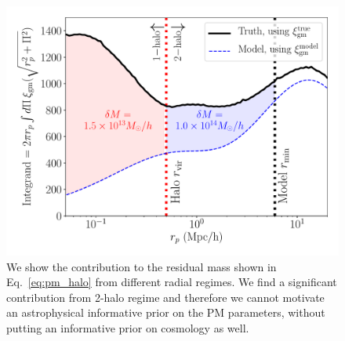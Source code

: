 \documentclass[aps, prd,twocolumn,superscriptaddress,nofootinbib,preprintnumbers]{revtex4-1}
\begin{document}
\begin{figure}
\includegraphics[width=\columnwidth]{figs/PM_contribution_radial.pdf}
\caption[]{We show the contribution to the residual mass shown in Eq.~\ref{eq:pm_halo} from different radial regimes. We find a significant contribution from 2-halo regime and therefore we cannot motivate an astrophysical informative prior on the PM parameters, without putting an informative prior on cosmology as well.  
}
\label{fig:pm_prior}
\end{figure}
\end{document}
